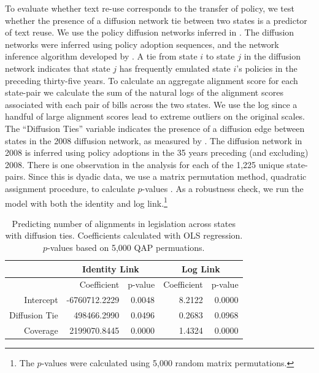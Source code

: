 \documentclass[12pt]{article} %
\begin{document}
To evaluate whether text re-use corresponds to the transfer of policy, we test whether the presence of a diffusion network tie between two states is a predictor of text reuse. We use the policy diffusion networks inferred in \citet{desmarais2015}. The diffusion networks were inferred using policy adoption sequences, and the network inference algorithm developed by \citet{gomez2010inferring}. A tie from state $i$ to state $j$ in the diffusion network indicates that state $j$ has frequently emulated state $i$'s policies in the preceding thirty-five years. To calculate an aggregate alignment score for each state-pair we calculate the sum of the natural logs of the alignment scores associated with each pair of bills across the two states. We use the log since a handful of large alignment scores lead to extreme outliers on the original scales. The ``Diffusion Ties'' variable indicates the presence of a diffusion edge between states in the 2008 diffusion network, as measured by \citet{desmarais2015}. The diffusion network in 2008 is inferred using policy adoptions in the 35 years preceding (and excluding) 2008.  There is one observation in the analysis for each of the 1,225 unique state-pairs. Since this is dyadic data, we use a matrix permutation method, quadratic assignment procedure, to calculate $p$-values \citep{krackhardt1988}. As a robustness check, we run the model with both the identity and log link.\footnote{The $p$-values were calculated using 5,000 random matrix permutations.}

\begin{table}[ht]
\centering
\begin{tabular}{rrrrr}
\hline
& \multicolumn{2}{c}{Identity Link} & \multicolumn{2}{c}{Log Link} \\
  \hline
 & Coefficient & p-value & Coefficient & p-value \\ 
  \hline
Intercept & -6760712.2229 & 0.0048 & 8.2122 & 0.0000 \\ 
  Diffusion Tie & 498466.2990 & 0.0496 & 0.2683 & 0.0968 \\ 
  Coverage & 2199070.8445 & 0.0000 & 1.4324 & 0.0000 \\ 
   \hline
\end{tabular}
\caption{Predicting number of alignments in legislation across states with diffusion ties. Coefficients calculated with OLS regression. $p$-values based on 5,000 QAP permuations.}
\label{tab:qap.diffusion}
\end{table}
\end{document}
